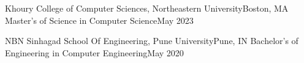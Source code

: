 
  \resumeSubHeadingListStart
    \resumeSubheading
      {Khoury College of Computer Sciences, Northeastern University}{Boston, MA}
      {Master's of Science in Computer Science}{May 2023}
      
    \resumeSubheading
      {NBN Sinhagad School Of Engineering, Pune University}{Pune, IN}
      {Bachelor's of Engineering in Computer Engineering}{May 2020}
      
  \resumeSubHeadingListEnd
